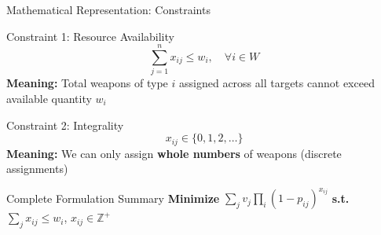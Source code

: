 \documentclass[aspectratio=43,8pt]{beamer}
\begin{document}
\begin{frame}{Mathematical Representation: Constraints}
\begin{block}{Constraint 1: Resource Availability}
\begin{equation*}
\sum_{j=1}^{n} x_{ij} \le w_i, \quad \forall i \in W
\end{equation*}
\textbf{Meaning:} Total weapons of type $i$ assigned across all targets cannot exceed available quantity $w_i$
\end{block}

\vspace{0.3cm}
\begin{alertblock}{Constraint 2: Integrality}
\begin{equation*}
x_{ij} \in \{0, 1, 2, \dots\}
\end{equation*}
\textbf{Meaning:} We can only assign \textbf{whole numbers} of weapons (discrete assignments)
\end{alertblock}

\vspace{0.3cm}
\begin{exampleblock}{Complete Formulation Summary}
\textbf{Minimize} $\sum_{j} v_j \prod_{i} (1-p_{ij})^{x_{ij}}$ \quad
\textbf{s.t.} $\sum_{j} x_{ij} \le w_i$, \quad $x_{ij} \in \mathbb{Z}^+$
\end{exampleblock}
\end{frame}
\end{document}
